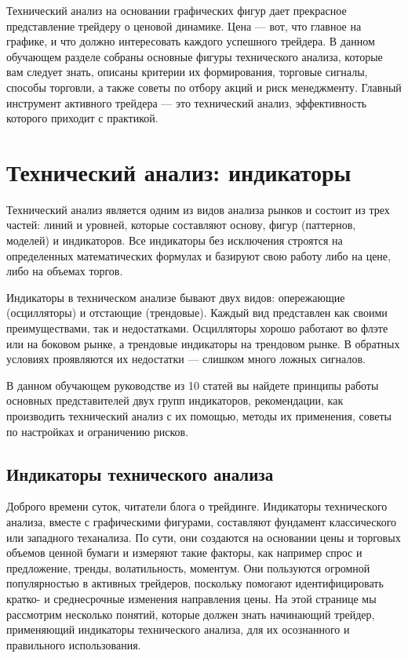\documentclass[a5paper]{article}
\begin{document}
Технический анализ на основании графических фигур дает прекрасное
представление трейдеру о ценовой динамике. Цена — вот, что главное на
графике, и что должно интересовать каждого успешного трейдера. В
данном обучающем разделе собраны основные фигуры технического анализа,
которые вам следует знать, описаны критерии их формирования, торговые
сигналы, способы торговли, а также советы по отбору акций и риск
менеджменту. Главный инструмент активного трейдера — это технический
анализ, эффективность которого приходит с практикой.



\section{Технический анализ: индикаторы}

Технический анализ является одним из видов анализа рынков и состоит из трех частей: линий и уровней, которые составляют основу, фигур (паттернов, моделей) и индикаторов. Все индикаторы без исключения строятся на определенных математических формулах и базируют свою работу либо на цене, либо на объемах торгов.

Индикаторы в техническом анализе бывают двух видов: опережающие (осцилляторы) и отстающие (трендовые). Каждый вид представлен как своими преимуществами, так и недостатками. Осцилляторы хорошо работают во флэте или на боковом рынке, а трендовые индикаторы на трендовом рынке. В обратных условиях проявляются их недостатки — слишком много ложных сигналов.

В данном обучающем руководстве из 10 статей вы найдете принципы работы
основных представителей двух групп индикаторов, рекомендации, как
производить технический анализ с их помощью, методы их применения,
советы по настройках и ограничению рисков.

\subsection{Индикаторы технического анализа}

Доброго времени суток, читатели блога о трейдинге. Индикаторы
технического анализа, вместе с графическими фигурами, составляют
фундамент классического или западного теханализа. По сути, они
создаются на основании цены и торговых объемов ценной бумаги и
измеряют такие факторы, как например спрос и предложение, тренды,
волатильность, моментум. Они пользуются огромной популярностью в
активных трейдеров, поскольку помогают идентифицировать кратко- и
среднесрочные изменения направления цены. На этой странице мы
рассмотрим несколько понятий, которые должен знать начинающий трейдер,
применяющий индикаторы технического анализа, для их осознанного и
правильного использования.
\end{document}
